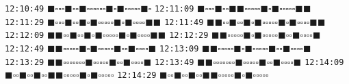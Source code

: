 \documentclass[letterpaper]{article}
\begin{document}
\begin{appendices}
\noindent\texttt{12:10:49} $\blacksquare\square\square\square\blacksquare\square\square\blacksquare\square\square\square\square\square\square\blacksquare\square\blacksquare\square\square\square\square\square\blacksquare\square$
\texttt{12:11:09} $\blacksquare\square\square\square\blacksquare\square\square\blacksquare\blacksquare\square\square\square\square\square\blacksquare\square\blacksquare\square\square\square\square\square\blacksquare\blacksquare$
\texttt{12:11:29} $\blacksquare\square\square\square\blacksquare\square\square\blacksquare\square\blacksquare\square\square\square\square\square\blacksquare\square\blacksquare\square\square\square\square\blacksquare\blacksquare$
\texttt{12:11:49} $\blacksquare\blacksquare\square\square\blacksquare\square\square\blacksquare\square\blacksquare\square\square\square\square\square\blacksquare\square\blacksquare\square\square\square\square\blacksquare\blacksquare$
\texttt{12:12:09} $\blacksquare\blacksquare\square\square\blacksquare\square\square\blacksquare\square\blacksquare\square\square\square\square\square\blacksquare\square\blacksquare\square\square\square\square\blacksquare\blacksquare$
\texttt{12:12:29} $\blacksquare\blacksquare\square\square\square\square\square\blacksquare\square\blacksquare\square\square\square\square\square\blacksquare\square\square\blacksquare\square\square\square\square\blacksquare$
\texttt{12:12:49} $\blacksquare\blacksquare\square\square\square\square\square\blacksquare\square\blacksquare\square\square\square\square\square\blacksquare\square\square\blacksquare\square\square\square\square\blacksquare$
\texttt{12:13:09} $\blacksquare\blacksquare\square\square\square\square\square\blacksquare\square\blacksquare\square\square\square\square\square\blacksquare\square\square\blacksquare\square\square\square\square\blacksquare$
\texttt{12:13:29} $\blacksquare\blacksquare\square\square\square\square\square\square\square\blacksquare\square\square\square\square\square\blacksquare\square\square\blacksquare\square\square\square\square\blacksquare$
\texttt{12:13:49} $\blacksquare\blacksquare\square\square\square\square\square\square\square\blacksquare\square\square\square\square\square\blacksquare\square\square\blacksquare\square\square\square\square\blacksquare$
\texttt{12:14:09} $\blacksquare\square\square\blacksquare\square\square\blacksquare\square\square\blacksquare\blacksquare\square\square\square\square\square\blacksquare\square\blacksquare\square\square\square\square\square$
\texttt{12:14:29} $\blacksquare\square\square\blacksquare\square\square\blacksquare\square\square\blacksquare\blacksquare\square\square\square\square\square\blacksquare\square\blacksquare\square\square\square\square\square$

\end{appendices}
\end{document}
